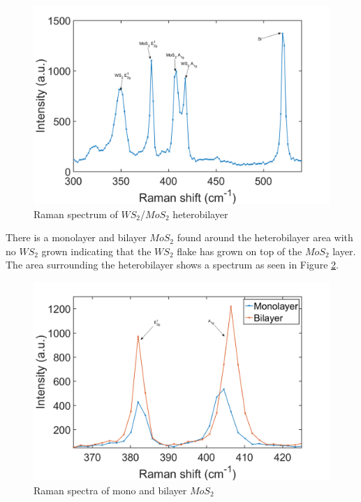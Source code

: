 \begin{figure}[H]
	\begin{center}
		\includegraphics[scale=0.3]{Heterostructures/RamanSpectrum2.png}
		\caption{Raman spectrum of $WS_2$/$MoS_2$ heterobilayer}
		\label{fig:HeterostructureRamanSpectrum}
	\end{center}
\end{figure}

There is a monolayer and bilayer $MoS_2$ found around the heterobilayer area with no $WS_2$ grown  indicating that the $WS_2$ flake has grown on top of the $MoS_2$ layer. The area surrounding the heterobilayer shows a spectrum as seen in Figure \ref{fig:HeterostructuresRamanSpectraMonoBi}. 

\begin{figure}[H]
	\begin{center}
		\includegraphics[scale=0.3]{Heterostructures/RamanSpectraMonoBi2.png}
		\caption{Raman spectra of mono and bilayer $MoS_2$}
		\label{fig:HeterostructuresRamanSpectraMonoBi}
	\end{center}
\end{figure}

